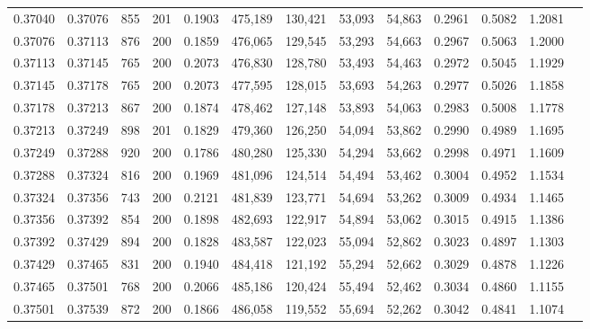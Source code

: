 \begin{tabular}{rrrrrrrrrrrrr}
0.37040 & 0.37076 &   855 & 201 &                                     0.1903 & 475,189 & 130,421 &  53,093 &  54,863 & 0.2961 & 0.5082 & 1.2081 \\
0.37076 & 0.37113 &   876 & 200 &                                     0.1859 & 476,065 & 129,545 &  53,293 &  54,663 & 0.2967 & 0.5063 & 1.2000 \\
0.37113 & 0.37145 &   765 & 200 &                                     0.2073 & 476,830 & 128,780 &  53,493 &  54,463 & 0.2972 & 0.5045 & 1.1929 \\
0.37145 & 0.37178 &   765 & 200 &                                     0.2073 & 477,595 & 128,015 &  53,693 &  54,263 & 0.2977 & 0.5026 & 1.1858 \\
0.37178 & 0.37213 &   867 & 200 &                                     0.1874 & 478,462 & 127,148 &  53,893 &  54,063 & 0.2983 & 0.5008 & 1.1778 \\
0.37213 & 0.37249 &   898 & 201 &                                     0.1829 & 479,360 & 126,250 &  54,094 &  53,862 & 0.2990 & 0.4989 & 1.1695 \\
0.37249 & 0.37288 &   920 & 200 &                                     0.1786 & 480,280 & 125,330 &  54,294 &  53,662 & 0.2998 & 0.4971 & 1.1609 \\
0.37288 & 0.37324 &   816 & 200 &                                     0.1969 & 481,096 & 124,514 &  54,494 &  53,462 & 0.3004 & 0.4952 & 1.1534 \\
0.37324 & 0.37356 &   743 & 200 &                                     0.2121 & 481,839 & 123,771 &  54,694 &  53,262 & 0.3009 & 0.4934 & 1.1465 \\
0.37356 & 0.37392 &   854 & 200 &                                     0.1898 & 482,693 & 122,917 &  54,894 &  53,062 & 0.3015 & 0.4915 & 1.1386 \\
0.37392 & 0.37429 &   894 & 200 &                                     0.1828 & 483,587 & 122,023 &  55,094 &  52,862 & 0.3023 & 0.4897 & 1.1303 \\
0.37429 & 0.37465 &   831 & 200 &                                     0.1940 & 484,418 & 121,192 &  55,294 &  52,662 & 0.3029 & 0.4878 & 1.1226 \\
0.37465 & 0.37501 &   768 & 200 &                                     0.2066 & 485,186 & 120,424 &  55,494 &  52,462 & 0.3034 & 0.4860 & 1.1155 \\
0.37501 & 0.37539 &   872 & 200 &                                     0.1866 & 486,058 & 119,552 &  55,694 &  52,262 & 0.3042 & 0.4841 & 1.1074 \\

\end{tabular}
